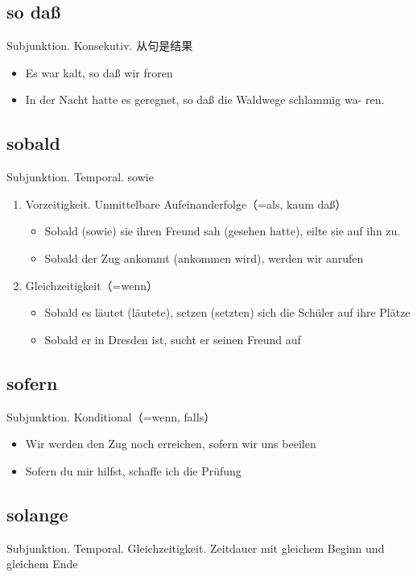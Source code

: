 \documentclass[UTF8]{report}
\begin{document}
\subsection{so daß}
Subjunktion. Konsekutiv. 从句是结果

\begin{itemize}
    \item Es war kalt, so daß wir froren
    \item In der Nacht hatte es geregnet, so daß die Waldwege schlammig wa- ren.
\end{itemize}


\subsection{sobald}
Subjunktion. Temporal. sowie
\begin{enumerate}
    \item Vorzeitigkeit. Unmittelbare Aufeinanderfolge（=als, kaum daß）
    \begin{itemize}
        \item Sobald (sowie) sie ihren Freund sah (gesehen hatte), eilte sie auf ihn zu.
        \item Sobald der Zug ankommt (ankommen wird), werden wir anrufen
    \end{itemize}
    \item Gleichzeitigkeit（=wenn）
    \begin{itemize}
        \item Sobald es läutet (läutete), setzen (setzten) sich die Schüler auf ihre Plätze
        \item Sobald er in Dresden ist, sucht er seinen Freund auf
    \end{itemize}
\end{enumerate}


\subsection{sofern}
Subjunktion. Konditional（=wenn, falls）
\begin{itemize}
    \item Wir werden den Zug noch erreichen, sofern wir uns beeilen
    \item Sofern du mir hilfst, schaffe ich die Prüfung
\end{itemize}

\subsection{solange}
Subjunktion. Temporal. Gleichzeitigkeit. Zeitdauer mit gleichem Beginn und gleichem Ende
\end{document}
